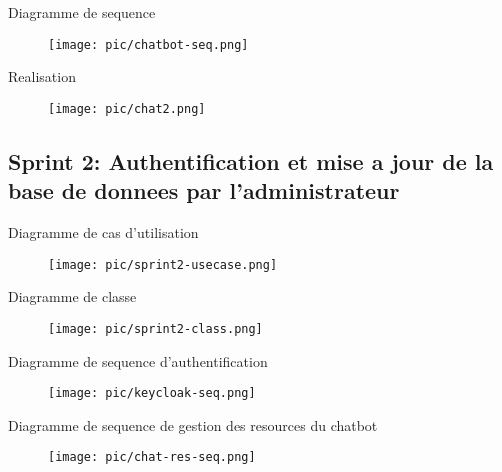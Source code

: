 \documentclass{beamer}
\begin{document}
\begin{frame}{Diagramme de sequence}
    \begin{figure}[htpb]
        \centering
        \texttt{[image: pic/chatbot-seq.png]}
    \end{figure}
\end{frame}

\begin{frame}{Realisation}
    \begin{figure}[htpb]
        \centering
        \texttt{[image: pic/chat2.png]}
    \end{figure}
\end{frame}


\subsection{Sprint 2: Authentification et mise a jour de la
    base de donnees par l’administrateur}
\begin{frame}{Diagramme de cas d'utilisation}

    \begin{figure}[htpb]
        \centering
        \texttt{[image: pic/sprint2-usecase.png]}
    \end{figure}
\end{frame}

\begin{frame}{Diagramme de classe}

    \begin{figure}[htpb]
        \centering
        \texttt{[image: pic/sprint2-class.png]}
    \end{figure}
\end{frame}

\begin{frame}{Diagramme de sequence d'authentification}
    \begin{figure}[htpb]
        \centering
        \texttt{[image: pic/keycloak-seq.png]}
    \end{figure}
\end{frame}

\begin{frame}{Diagramme de sequence de gestion des resources du chatbot}
    \begin{figure}[htpb]
        \centering
        \texttt{[image: pic/chat-res-seq.png]}
    \end{figure}
\end{frame}
\end{document}
